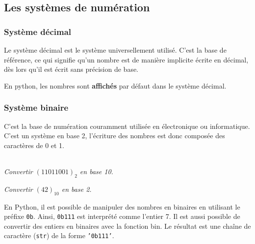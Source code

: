 \subsection{Les systèmes de numération}
\subsubsection{Système décimal}
Le système décimal est le système universellement utilisé. C'est la base de référence, ce qui signifie qu'un nombre est de manière implicite écrite en décimal, dès lors qu'il est écrit sans précision de base. 

En python, les nombres sont \textbf{affichés} par défaut dans le système décimal. 

\subsubsection{Système binaire}

C'est la base de numération couramment utilisée en électronique ou informatique. C'est un système en base 2, l'écriture des nombres est donc composée des caractères de 0 et 1. 



\begin{exemple}~\\

\textit{Convertir $\left(11011001\right)_2$ en base 10.}

\textit{Convertir $\left(42\right)_{10}$ en base 2.}
\end{exemple}

En Python, il est possible de manipuler des nombres en binaires en utilisant le préfixe \texttt{0b}. Ainsi, \texttt{0b111} est interprété comme l'entier 7. 
Il est aussi possible de convertir des entiers en binaires avec la fonction bin. Le résultat est une chaîne de caractère (\texttt{str}) de la forme \texttt{'0b111'}.


